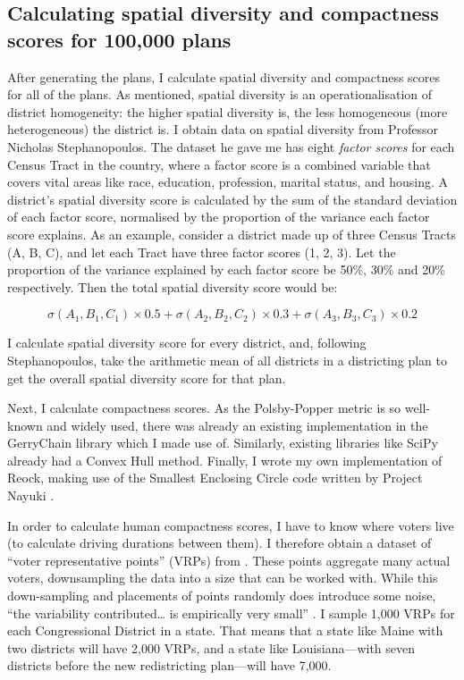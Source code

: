\documentclass[]{article}
\begin{document}
\hypertarget{calculating-spatial-diversity-and-compactness-scores-for-100000-plans}{%
\subsection{Calculating spatial diversity and compactness scores for
100,000
plans}\label{calculating-spatial-diversity-and-compactness-scores-for-100000-plans}}

After generating the plans, I calculate spatial diversity and
compactness scores for all of the plans. As mentioned, spatial diversity
is an operationalisation of district homogeneity: the higher spatial
diversity is, the less homogeneous (more heterogeneous) the district is.
I obtain data on spatial diversity from Professor Nicholas
Stephanopoulos. The dataset he gave me has eight \emph{factor scores}
for each Census Tract in the country, where a factor score is a combined
variable that covers vital areas like race, education, profession,
marital status, and housing. A district's spatial diversity score is
calculated by the sum of the standard deviation of each factor score,
normalised by the proportion of the variance each factor score explains.
As an example, consider a district made up of three Census Tracts (A, B,
C), and let each Tract have three factor scores (1, 2, 3). Let the
proportion of the variance explained by each factor score be 50\%, 30\%
and 20\% respectively. Then the total spatial diversity score would be:

\[ \sigma(A_1, B_1, C_1) \times 0.5 + \sigma(A_2, B_2, C_2) \times 0.3 + \sigma(A_3,
B_3, C_3) \times 0.2\]

I calculate spatial diversity score for every district, and, following
Stephanopoulos, take the arithmetic mean of all districts in a
districting plan to get the overall spatial diversity score for that
plan.

Next, I calculate compactness scores. As the Polsby-Popper metric is so
well-known and widely used, there was already an existing implementation
in the GerryChain library which I made use of. Similarly, existing
libraries like SciPy already had a Convex Hull method. Finally, I wrote
my own implementation of Reock, making use of the Smallest Enclosing
Circle code written by Project Nayuki \citep{nayuki2020}.

In order to calculate human compactness scores, I have to know where
voters live (to calculate driving durations between them). I therefore
obtain a dataset of ``voter representative points'' (VRPs) from
\cite{er2019}. These points aggregate many actual voters, downsampling
the data into a size that can be worked with. While this down-sampling
and placements of points randomly does introduce some noise, ``the
variability contributed\ldots{} is empirically very small''
\citep{er2019}. I sample 1,000 VRPs for each Congressional District in a
state. That means that a state like Maine with two districts will have
2,000 VRPs, and a state like Louisiana---with seven districts before the
new redistricting plan---will have 7,000.
\end{document}
